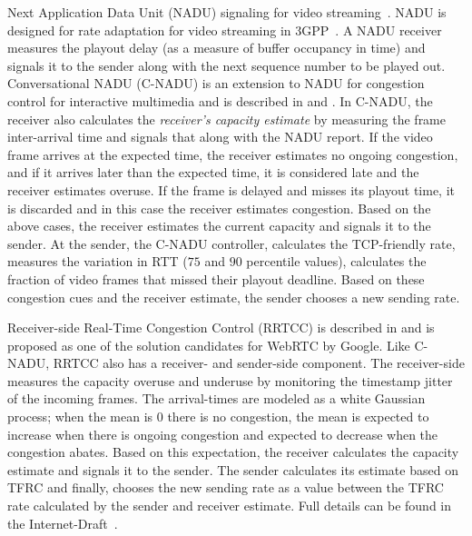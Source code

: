 Next Application Data Unit (NADU) signaling for video
streaming~\cite{nadu.1070341,nadu.1530486}. NADU is designed for rate
adaptation for video streaming in 3GPP~\cite{3gpp.26.234}. A NADU receiver
measures the playout delay (as a measure of buffer occupancy in time) and
signals it to the sender along with the next sequence number to be played out.
Conversational NADU (C-NADU) is an extension to NADU for congestion control
for interactive multimedia and is described in  and
. In C-NADU, the receiver also calculates the
\emph{receiver's capacity estimate} by measuring the frame inter-arrival time
and signals that along with the NADU report. If the video frame arrives at the
expected time, the receiver estimates no ongoing congestion, and if it arrives
later than the expected time, it is considered late and the receiver estimates
overuse. If the frame is delayed and misses its playout time, it is discarded
and in this case the receiver estimates congestion. Based on the above cases,
the receiver estimates the current capacity and signals it to the sender. At
the sender, the C-NADU controller, calculates the TCP-friendly rate, measures
the variation in RTT ($75$ and $90$ percentile values), calculates the
fraction of video frames that missed their playout deadline. Based on these
congestion cues and the receiver estimate, the sender chooses a new sending
rate.


Receiver-side Real-Time Congestion Control (RRTCC) is described in
\cite{draft.rrtcc} and is proposed as one of the solution candidates for
WebRTC by Google. Like C-NADU, RRTCC also has a receiver- and sender-side
component. The receiver-side measures the capacity overuse and underuse by
monitoring the timestamp jitter of the incoming frames. The arrival-times are
modeled as a white Gaussian process; when the mean is 0 there is no
congestion, the mean is expected to increase when there is ongoing congestion
and expected to decrease when the congestion abates. Based on this
expectation, the receiver calculates the capacity estimate and signals it to
the sender. The sender calculates its estimate based on TFRC and finally,
chooses the new sending rate as a value between the TFRC rate calculated by
the sender and receiver estimate. Full details can be found in the
Internet-Draft~\cite{draft.rrtcc}.



